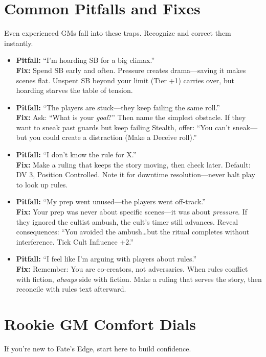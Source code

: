 \section{Common Pitfalls and Fixes}
Even experienced GMs fall into these traps. Recognize and correct them instantly.

\begin{tcolorbox}[colback=red!5!white, colframe=red!75!black, title=Pitfall Fixes,breakable]
\begin{itemize}
  \item \textbf{Pitfall:} ``I'm hoarding SB for a big climax.'' \\
  \textbf{Fix:} Spend SB early and often. Pressure creates drama---saving it makes scenes flat. Unspent SB beyond your limit (Tier +1) carries over, but hoarding starves the table of tension.
  \item \textbf{Pitfall:} ``The players are stuck---they keep failing the same roll.'' \\
  \textbf{Fix:} Ask: ``What is your \textit{goal}?'' Then name the simplest obstacle. If they want to sneak past guards but keep failing Stealth, offer: ``You can't sneak---but you could create a distraction (Make a Deceive roll).'' 
  \item \textbf{Pitfall:} ``I don't know the rule for X.'' \\
  \textbf{Fix:} Make a ruling that keeps the story moving, then check later. Default: DV 3, Position Controlled. Note it for downtime resolution---never halt play to look up rules.
  \item \textbf{Pitfall:} ``My prep went unused---the players went off-track.'' \\
  \textbf{Fix:} Your prep was never about specific scenes---it was about \textit{pressure}. If they ignored the cultist ambush, the cult's timer still advances. Reveal consequences: ``You avoided the ambush\dots but the ritual completes without interference. Tick Cult Influence +2.''
  \item \textbf{Pitfall:} ``I feel like I'm arguing with players about rules.'' \\
  \textbf{Fix:} Remember: You are co-creators, not adversaries. When rules conflict with fiction, \textit{always} side with fiction. Make a ruling that serves the story, then reconcile with rules text afterward.
\end{itemize}
\end{tcolorbox}

\section{Rookie GM Comfort Dials}
If you're new to Fate's Edge, start here to build confidence.

